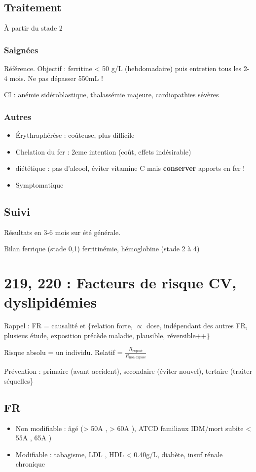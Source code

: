 \documentclass[11pt]{article}
\begin{document}
\subsection{Traitement}
\label{sec:orgd883153}
À partir du stade 2

\subsubsection{Saignées}
\label{sec:orgf7ad11c}
Référence. Objectif : ferritine < 50 g/L (hebdomadaire) puis entretien tous les
  2-4 mois. Ne pas dépasser 550mL !

CI : anémie sidéroblastique, thalassémie majeure, cardiopathies sévères

\subsubsection{Autres}
\label{sec:orga6aae64}
\begin{itemize}
\item Érythraphérèse : coûteuse, plus difficile
\item Chelation du fer : 2eme intention (coût, effets indésirable)
\item diététique : pas d'alcool, éviter vitamine C mais \textbf{conserver} apports en fer !
\item Symptomatique
\end{itemize}

\subsection{Suivi}
\label{sec:orgace5d04}
Résultats en 3-6 mois sur été générale. 

Bilan ferrique (stade 0,1) ferritinémie, hémoglobine (stade 2 à 4)

\section{219, 220 :  Facteurs de risque CV, dyslipidémies}
\label{sec:orgbd8d9e5}
Rappel : FR = causalité et \{relation forte, \(\propto\) dose, indépendant des autres
FR, plusieus étude, exposition précède maladie, plausible, réversible++\}

Risque absolu = un individu. Relatif = \(\frac{R_{\text{exposé}}}{R_{\text{non exposé}}}\)

Prévention : primaire (avant accident), secondaire (éviter nouvel), tertaire
(traiter séquelles\}

\subsection{FR}
\label{sec:orgd60975b}
\begin{itemize}
\item Non modifiable : âgé (> 50A \male, > 60A \female), ATCD familiaux IDM/mort
subite < 55A \male, 65A \female)
\item Modifiable : tabagisme, LDL \inc, HDL < 0.40g/L, diabète, insuf rénale
chronique
\end{itemize}
\end{document}
